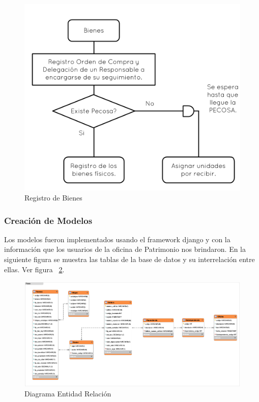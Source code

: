 \begin{figure}[h!]
  \centering
  \includegraphics[scale=0.6]{images/activities/camila/bienes.png}
  \caption{Registro de Bienes}
  \label{fig:bienes}
\end{figure}

\subsubsection{Creación de Modelos}
Los modelos fueron implementados usando el framework django y con la información que los usuarios de la oficina de Patrimonio nos brindaron. En la siguiente figura se muestra las tablas de la base de datos y su interrelación entre ellas. Ver figura ~\ref{fig:diagrama-er}.

\begin{figure}
  \centering
  \includegraphics[scale=0.38]{images/activities/camila/diagrama-er.png}
  \caption{Diagrama Entidad Relación}
  \label{fig:diagrama-er}
\end{figure}

